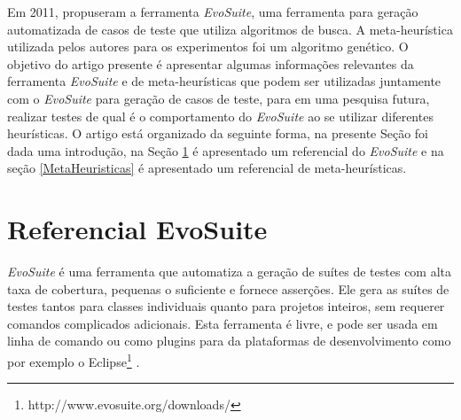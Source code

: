 \documentclass[conference]{IEEEtran}
\begin{document}

    
    
    

Em 2011, \cite{fraser2011evosuite} propuseram a ferramenta \emph{EvoSuite}, uma ferramenta para geração automatizada de casos de teste que utiliza algoritmos de busca. A meta-heurística utilizada pelos autores para os experimentos foi um algoritmo genético. O objetivo do artigo presente é apresentar algumas informações relevantes da ferramenta \emph{EvoSuite} e de meta-heurísticas que podem ser utilizadas juntamente com o \emph{EvoSuite} para geração de casos de teste, para em uma pesquisa futura, realizar testes de qual é o comportamento do \emph{EvoSuite} ao se utilizar diferentes heurísticas. O artigo está organizado da seguinte forma, na presente Seção foi dada uma introdução, na Seção \ref{ReferencialEvoSuite} é apresentado um referencial do \emph{EvoSuite} e na seção \ref{MetaHeuristicas} é apresentado um referencial de meta-heurísticas.


\section{Referencial EvoSuite} \label{ReferencialEvoSuite}

\textit{EvoSuite} é uma ferramenta que automatiza a geração de suítes de testes com alta taxa de cobertura, pequenas o suficiente e fornece asserções. Ele gera as suítes de testes tantos para classes individuais quanto para projetos inteiros, sem requerer comandos complicados adicionais. Esta ferramenta é livre, e pode ser usada em linha de comando ou como  plugins para da plataformas de desenvolvimento como por exemplo o Eclipse\footnote{http://www.evosuite.org/downloads/} \cite{fraser2011evosuite}.
\end{document}
